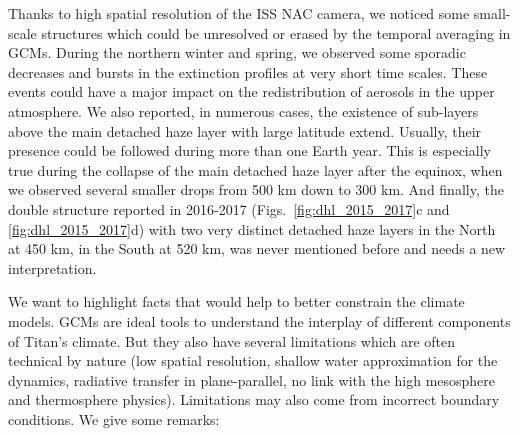 Thanks to high spatial resolution of the ISS NAC camera, we noticed some small-scale structures which could be unresolved or
erased by the temporal averaging in GCMs. During the northern winter and spring, we observed some sporadic decreases and
bursts in the extinction profiles at very short time scales. These events could have a major impact on the redistribution of
aerosols in the upper atmosphere. We also reported, in numerous cases, the existence of sub-layers above the main detached
haze layer with large latitude extend. Usually, their presence could be followed during more than one Earth year. This is
especially true during the collapse of the main detached haze layer after the equinox, when we observed several smaller
drops from 500 km down to 300 km. And finally, the double structure reported in 2016-2017
(Figs.~\ref{fig:dhl_2015_2017}c and \ref{fig:dhl_2015_2017}d) with two very distinct detached haze layers in the
North at 450 km, in the South at 520 km, was never mentioned before and needs a new interpretation.

We want to highlight facts that would help to better constrain the climate models. 
GCMs are ideal tools to understand the interplay of different components of Titan's climate.
But they also have several limitations which are often technical by nature (low spatial resolution, shallow water
approximation for the dynamics, radiative transfer in plane-parallel, no link with the high mesosphere and thermosphere physics).
Limitations may also come from incorrect boundary conditions. We give some remarks:

